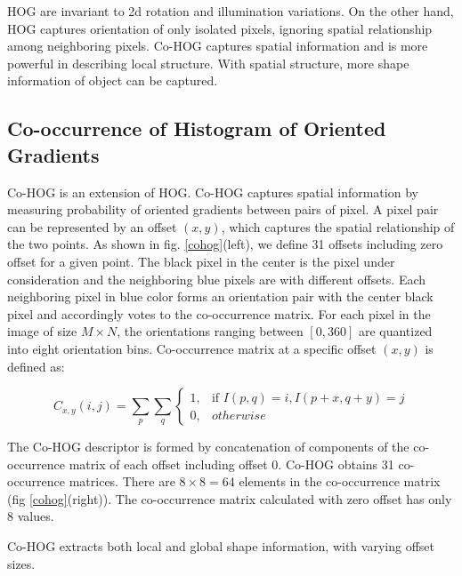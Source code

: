 HOG are invariant to 2d rotation and illumination variations. On the other hand, HOG captures orientation of only isolated pixels, ignoring spatial relationship among neighboring pixels. Co-HOG captures spatial information and is more powerful in describing local structure. With spatial structure, more shape information of object can be captured.

\subsection{Co-occurrence of Histogram of Oriented Gradients}\label{sssec:cohog}

Co-HOG is an extension of HOG. Co-HOG captures spatial information by measuring probability of oriented gradients between pairs of pixel. A pixel pair can be represented by an offset $(x, y)$, which captures the spatial relationship of the two points. As shown in fig. \ref{cohog}(left), we define 31 offsets including zero offset for a given point. The black pixel in the center is the pixel under consideration and the neighboring blue pixels are with different offsets. Each neighboring pixel in blue color forms an orientation pair with the center black pixel and accordingly votes to the co-occurrence matrix. For each pixel in the image of size $M \times N$, the orientations ranging between $[0, 360]$ are quantized into eight orientation bins. Co-occurrence matrix at a specific offset $(x, y)$ is defined as:
		
			\begin{equation}\label{eq:cohog}
				C_{x,y}(i, j) = \sum_{p}\sum_{q}\begin{cases} 1, & \mbox{if } I(p, q) = i, I(p + x, q + y) = j\\ 
				0, &  otherwise \end{cases} 
				\end{equation} 
				\normalsize 
				
The Co-HOG descriptor is formed by concatenation of components of the co-occurrence matrix of each offset including offset 0. Co-HOG obtains 31 co-occurrence matrices. There are $8 \times 8 = 64$ elements in the co-occurrence matrix (fig \ref{cohog}(right)). The co-occurrence matrix calculated with zero offset has only 8 values.

Co-HOG extracts both local and global shape information, with varying offset sizes. 

